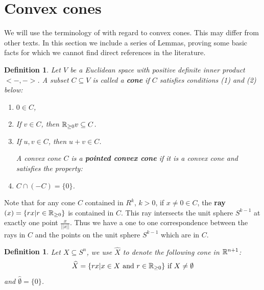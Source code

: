 \documentclass[psamsfonts]{amsart}
\numberwithin{equation}{subsection}
\theoremstyle{plain}
\newtheorem{definition}[theorem]{Definition}
\theoremstyle{definition}
\theoremstyle{remark}
\begin{document}
\section{Convex cones }
We will use the terminology   of \cite{Fenchel} with regard to convex cones. This may differ from other texts. In this section we include a series of Lemmas, proving some basic facts for 
which we cannot find direct references in the literature. 

\begin{definition} \label{cones} Let $V$ be a Euclidean space with positive definite inner product $<- , ->$. A subset $C \subseteq V$ is called a {\bf cone} if $C$ satisfies  conditions (1) and (2) below:
\begin{enumerate}
\item $0 \in C$,
\item If $v \in C$, then $\Bbb{R}_{\geq 0}v \subseteq  C$.

\noindent
{}

\item If $u, v \in C$, then $u + v \in C$.

\noindent 
A convex cone $C$  is a  {\bf pointed convex cone}
 if it is a convex cone and satisfies the property:
\item  $C \cap (-C) = \{0\}$.
\end{enumerate}
\end{definition}

Note that for any cone $C$ contained in $R^k$, $k > 0$, if $x \not= 0  \in C$, the {\bf  ray}  $(x) = \{rx | r \in \Bbb{R}_{\geq 0}\}$ is contained in $C$. This ray 
intersects the unit sphere $S^{k - 1}$ at exactly one point $\frac{x}{||x||}$. Thus we have a one to one correspondence between the rays in $C$ and the points on the unit sphere $S^{k - 1}$ which are  in $C$. 

\begin{definition} \label{hatconedef} Let $X \subseteq S^n$, we use  $\widehat{X}$ to denote the following  cone in $\Bbb{R}^{n + 1}$:
$$\widehat{X} = \{rx | x \in X \ \mbox{and} \ r \in \Bbb{R}_{\geq 0} \} \ \mbox{if} \ X \not= \emptyset$$
and $\widehat{\emptyset} = \{0\}$. 

\end{definition}
\end{document}
